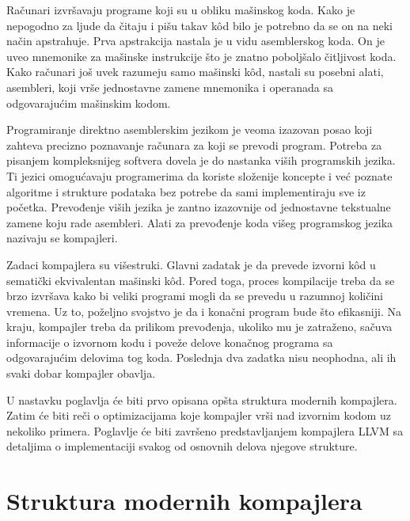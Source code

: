 \documentclass[12pt,oneside]{memoir}
\begin{document}
Računari izvršavaju programe koji su u obliku mašinskog koda.
Kako je nepogodno za ljude da čitaju i pišu takav k\^od bilo je potrebno da se on na neki način apstrahuje.
Prva apstrakcija nastala je u vidu asemblerskog koda.
On je uveo mnemonike za mašinske instrukcije što je znatno poboljšalo čitljivost koda.
Kako računari još uvek razumeju samo mašinski k\^od, nastali su posebni alati, asembleri, koji vrše jednostavne zamene mnemonika i operanada sa odgovarajućim mašinskim kodom.

Programiranje direktno asemblerskim jezikom je veoma izazovan posao koji zahteva precizno poznavanje računara za koji se prevodi program.
Potreba za pisanjem kompleksnijeg softvera dovela je do nastanka viših programskih jezika.
Ti jezici omogućavaju programerima da koriste složenije koncepte i već poznate algoritme i strukture podataka bez potrebe da sami implementiraju sve iz početka.
Prevođenje viših jezika je zantno izazovnije od jednostavne tekstualne zamene koju rade asembleri.
Alati za prevođenje koda višeg programskog jezika nazivaju se kompajleri.


Zadaci kompajlera su višestruki.
Glavni zadatak je da prevede izvorni k\^od u sematički ekvivalentan mašinski k\^od.
Pored toga, proces kompilacije treba da se brzo izvršava kako bi veliki programi mogli da se prevedu u razumnoj količini vremena.
Uz to, poželjno svojstvo je da i konačni program bude što efikasniji.
Na kraju, kompajler treba da prilikom prevođenja, ukoliko mu je zatraženo, sačuva informacije o izvornom kodu i poveže delove konačnog programa sa odgovarajućim delovima tog koda.
Poslednja dva zadatka nisu neophodna, ali ih svaki dobar kompajler obavlja.

U nastavku poglavlja će biti prvo opisana opšta struktura modernih kompajlera.
Zatim će biti reči o optimizacijama koje kompajler vrši nad izvornim kodom uz nekoliko primera.
Poglavlje će biti završeno predstavljanjem kompajlera LLVM sa detaljima o implementaciji svakog od osnovnih delova njegove strukture.


\section{Struktura modernih kompajlera}
\label{sec:compiler_structure}

\end{document}
